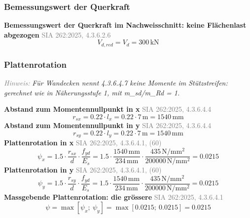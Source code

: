 \documentclass[11pt,a4paper]{article}
\newcommand{\normref}[1]{{\small\textcolor{gray}{#1}}}
\newcommand{\hinweis}[2]{\par\noindent\textcolor{gray}{\textit{#1:}} \textit{#2}\par}
\begin{document}
\subsubsection{Bemessungswert der Querkraft}
\noindent\textbf{Bemessungswert der Querkraft im Nachweisschnitt: keine Flächenlast abgezogen} \hfill \normref{SIA 262:2025, 4.3.6.2.6}
\begin{equation*}
V_{d,red} = V_d = 300\,\mathrm{kN}
\end{equation*}
\subsubsection{Plattenrotation}
\hinweis{Hinweis}{Für Wandecken nennt 4.3.6.4.7 keine Momente im Stützstreifen: gerechnet wie in Näherungsstufe 1, mit m\_sd/m\_Rd = 1.}
\noindent\textbf{Abstand zum Momentennullpunkt in x} \hfill \normref{SIA 262:2025, 4.3.6.4.4}
\begin{equation*}
r_{sx} = 0.22 \cdot l_x = 0.22 \cdot 7\,\mathrm{m} = 1540\,\mathrm{mm}
\end{equation*}
\noindent\textbf{Abstand zum Momentennullpunkt in y} \hfill \normref{SIA 262:2025, 4.3.6.4.4}
\begin{equation*}
r_{sy} = 0.22 \cdot l_y = 0.22 \cdot 7\,\mathrm{m} = 1540\,\mathrm{mm}
\end{equation*}
\noindent\textbf{Plattenrotation in x} \hfill \normref{SIA 262:2025, 4.3.6.4.1, (60)}
\begin{equation*}
\psi_x = 1.5 \cdot \frac{r_{sx}}{d} \cdot \frac{f_{yd}}{E_s} = 1.5 \cdot \frac{1540\,\mathrm{mm}}{234\,\mathrm{mm}} \cdot \frac{435\,\mathrm{N}/\mathrm{mm}^{2}}{200000\,\mathrm{N}/\mathrm{mm}^{2}} = 0.0215
\end{equation*}
\noindent\textbf{Plattenrotation in y} \hfill \normref{SIA 262:2025, 4.3.6.4.1, (60)}
\begin{equation*}
\psi_y = 1.5 \cdot \frac{r_{sy}}{d} \cdot \frac{f_{yd}}{E_s} = 1.5 \cdot \frac{1540\,\mathrm{mm}}{234\,\mathrm{mm}} \cdot \frac{435\,\mathrm{N}/\mathrm{mm}^{2}}{200000\,\mathrm{N}/\mathrm{mm}^{2}} = 0.0215
\end{equation*}
\noindent\textbf{Massgebende Plattenrotation: die grössere} \hfill \normref{SIA 262:2025, 4.3.6.4.1}
\begin{equation*}
\psi = \max\left[\psi_x;\ \psi_y\right] = \max\left[0.0215;\ 0.0215\right] = 0.0215
\end{equation*}
\end{document}
